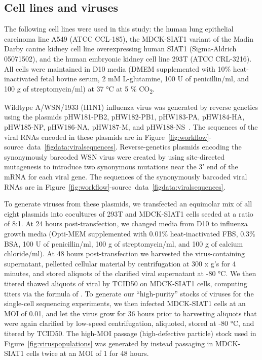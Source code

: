 \documentclass[9pt,lineno]{elife}
\begin{document}
\subsection{Cell lines and viruses}
The following cell lines were used in this study: the human lung epithelial carcinoma line A549 (ATCC CCL-185), the MDCK-SIAT1 variant of the Madin Darby canine kidney cell line overexpressing human SIAT1 (Sigma-Aldrich 05071502), and the human embryonic kidney cell line 293T (ATCC CRL-3216). 
All cells were maintained in D10 media (DMEM supplemented with 10\% heat-inactivated fetal bovine serum, 2 mM L-glutamine, 100 U of penicillin/ml, and 100 \si{\micro}g of streptomycin/ml) at 37 \si{\degreeCelsius} at 5 \% CO\textsubscript{2}.

Wildtype A/WSN/1933 (H1N1) influenza virus was generated by reverse genetics using the plasmids pHW181-PB2, pHW182-PB1, pHW183-PA, pHW184-HA, pHW185-NP, pHW186-NA, pHW187-M, and pHW188-NS~\citep{hoffmann2000dna}.
The sequences of the viral RNAs encoded in these plasmids are in Figure~\ref{fig:workflow}-source~data~\ref{figdata:viralsequences}.
Reverse-genetics plasmids encoding the synonymously barcoded WSN virus were created by using site-directed mutagenesis to introduce two synonymous mutations near the 3' end of the mRNA for each viral gene.
The sequences of the synonymously barcoded viral RNAs are in Figure~\ref{fig:workflow}-source~data~\ref{figdata:viralsequences}.

To generate viruses from these plasmids, we transfected an equimolar mix of all eight plasmids into cocultures of 293T and MDCK-SIAT1 cells seeded at a ratio of 8:1. 
At 24 hours post-transfection, we changed media from D10 to influenza growth media (Opti-MEM supplemented with 0.01\% heat-inactivated FBS, 0.3\% BSA, 100 U of penicillin/ml, 100  \si{\micro}g of streptomycin/ml, and 100 \si{\micro}g of calcium chloride/ml).
At 48 hours post-transfection we harvested the virus-containing supernatant, pelletted cellular material by centrifugation at 300 x g's for 4 minutes, and stored aliquots of the clarified viral supernatant at -80 \si{\degreeCelsius }. 
We then titered thawed aliquots of viral by TCID50 on MDCK-SIAT1 cells, computing titers via the formula of \citet{reed1938simple}.
To generate our ``high-purity'' stocks of viruses for the single-cell sequencing experiments, we then infected MDCK-SIAT1 cells at an MOI of 0.01, and let the virus grow for 36 hours prior to harvesting aliquots that were again clarified by low-speed centrifugation, aliquoted, stored at -80  \si{\degreeCelsius }, and titered by TCID50.
The high-MOI passage (high-defective particle) stock used in Figure~\ref{fig:viruspopulations} was generated by instead passaging in MDCK-SIAT1 cells twice at an MOI of 1 for 48 hours.
\end{document}
